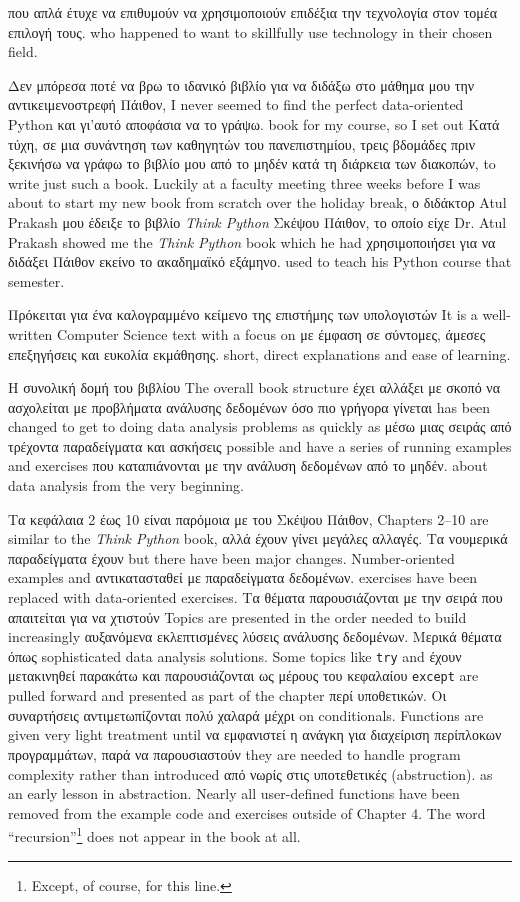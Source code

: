 που απλά έτυχε να επιθυμούν να χρησιμοποιούν επιδέξια την τεχνολογία στον τομέα επιλογή τους.
who happened to want to skillfully use technology in their chosen field.

Δεν μπόρεσα ποτέ να βρω το ιδανικό βιβλίο για να διδάξω στο μάθημα μου την αντικειμενοστρεφή Πάιθον,
I never seemed to find the perfect data-oriented Python
και γι'αυτό αποφάσια να το γράψω.
book for my course, so I set out 
Κατά τύχη, σε μια συνάντηση των καθηγητών του πανεπιστημίου, τρεις βδομάδες πριν ξεκινήσω να γράφω το βιβλίο μου από το μηδέν κατά τη διάρκεια των διακοπών, 
to write just such a book.  Luckily at a faculty meeting three weeks
before I was about to start my new book from scratch over 
the holiday break, 
ο διδάκτορ Atul Prakash μου έδειξε το βιβλίο \emph{Think Python} Σκέψου Πάιθον, το οποίο είχε   
Dr. Atul Prakash showed me the \emph{Think Python} book which he had
χρησιμοποιήσει για να διδάξει Πάιθον εκείνο το ακαδημαϊκό εξάμηνο.
used to teach his Python course that semester.  

Πρόκειται για ένα καλογραμμένο κείμενο της επιστήμης των υπολογιστών 
It is a well-written Computer Science text with a focus on 
με έμφαση σε σύντομες, άμεσες επεξηγήσεις και ευκολία εκμάθησης.
short, direct explanations and ease of learning.  

Η συνολική δομή του βιβλίου
The overall book structure
έχει αλλάξει με σκοπό να ασχολείται με προβλήματα ανάλυσης δεδομένων όσο πιο γρήγορα γίνεται
has been changed to get to doing data analysis problems as quickly as
μέσω μιας σειράς από τρέχοντα παραδείγματα και ασκήσεις
possible and have a series of running examples and exercises 
που καταπιάνονται με την ανάλυση δεδομένων από το μηδέν.
about data analysis from the very beginning.  

Τα κεφάλαια 2 έως 10 είναι παρόμοια με του Σκέψου Πάιθον,
Chapters 2--10 are similar to the \emph{Think Python} book,
αλλά έχουν γίνει μεγάλες αλλαγές. Τα νουμερικά παραδείγματα έχουν 
but there have been major changes. Number-oriented examples and
αντικατασταθεί με παραδείγματα δεδομένων. 
exercises have been replaced with data-oriented exercises.
Τα θέματα παρουσιάζονται με την σειρά που απαιτείται για να χτιστούν 
Topics are presented in the order needed to build increasingly
αυξανόμενα εκλεπτισμένες λύσεις ανάλυσης δεδομένων. Μερικά θέματα όπως 
sophisticated data analysis solutions. Some topics like {\tt try} and
έχουν μετακινηθεί παρακάτω και παρουσιάζονται ως μέρους του κεφαλαίου 
{\tt except} are pulled forward and presented as part of the chapter
περί υποθετικών. Οι συναρτήσεις αντιμετωπίζονται πολύ χαλαρά μέχρι 
on conditionals.  Functions are given very light treatment until 
να εμφανιστεί η ανάγκη για διαχείριση περίπλοκων προγραμμάτων, παρά να παρουσιαστούν
they are needed to handle program complexity rather than introduced 
από νωρίς στις υποτεθετικές (abstruction).
as an early lesson in abstraction.  Nearly all user-defined functions
have been removed from the example code and exercises outside of Chapter 4.
The word ``recursion''\footnote{Except, of course, for this line.}
does not appear in the book at all.

